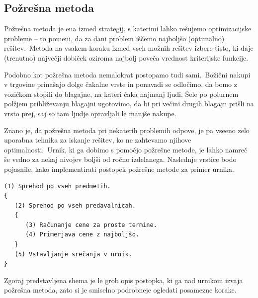 \documentclass[a4paper,10pt]{article}
\begin{document}
\subsection{Požrešna metoda}

Požrešna metoda je ena izmed strategij, s katerimi lahko rešujemo optimizacijske probleme --
to pomeni, da za dani problem iščemo najboljšo (optimalno) rešitev.\ Metoda na vsakem koraku
izmed vseh možnih rešitev izbere  tisto, ki daje (trenutno) največji dobiček oziroma najbolj
poveča vrednost kriterijske funkcije.

Podobno kot požrešna metoda nemalokrat postopamo tudi sami.\ Božični nakupi v trgovine
prinašajo dolge čakalne vrste in ponavadi se odločimo, da bomo z vozičkom stopili do blagajne,
na kateri čaka najmanj ljudi. Šele po polurnem polžjem približevanju blagajni ugotovimo,
da bi pri večini drugih blagajn prišli na vrsto prej, saj so tam ljudje opravljali le
manjše nakupe.

Znano je, da požrešna metoda pri nekaterih problemih odpove, je pa vseeno zelo uporabna
tehnika za iskanje rešitev, ko ne zahtevamo njihove optimalnosti.\ Urnik, ki ga dobimo s
pomočjo požrešne metode, je lahko namreč še vedno za nekaj nivojev boljši od ročno izdelanega.
Naslednje vrstice bodo pojasnile, kako implementirati postopek požrešne metode za primer urnika.

\begin{verbatim}
(1) Sprehod po vseh predmetih.
{
   (2) Sprehod po vseh predavalnicah.
   {
      (3) Računanje cene za proste termine.
      (4) Primerjava cene z najboljšo.
   }
   (5) Vstavljanje srečanja v urnik.
}
\end{verbatim}

\noindent Zgoraj predstavljena shema je le grob opis postopka, ki ga nad urnikom izvaja požrešna metoda,
zato si je smiselno podrobneje ogledati posamezne korake.
\end{document}
